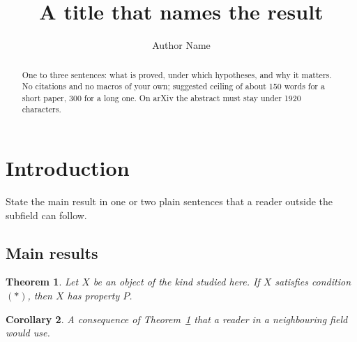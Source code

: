 \documentclass{amsart}
\theoremstyle{plain}
\newtheorem{theorem}{Theorem}[section]
\newtheorem{corollary}[theorem]{Corollary}
\theoremstyle{definition}
\theoremstyle{remark}
\begin{document}
\title[Short running title]{A title that names the result}
\author{Author Name}
\address{Department, Institution, City, Country}

\begin{abstract}
One to three sentences: what is proved, under which hypotheses, and why it matters.
No citations and no macros of your own; suggested ceiling of about 150 words for a short paper, 300 for a long one.
On arXiv the abstract must stay under 1920 characters.
\end{abstract}


\maketitle

\section{Introduction}\label{sec:intro}

State the main result in one or two plain sentences that a reader outside the
subfield can follow.

\subsection{Main results}\label{subsec:main}
\begin{theorem}\label{thm:main}
Let $X$ be an object of the kind studied here. If $X$ satisfies condition $(\ast)$,
then $X$ has property $P$.
\end{theorem}

\begin{corollary}\label{cor:main}
A consequence of Theorem~\ref{thm:main} that a reader in a neighbouring field would use.
\end{corollary}
\end{document}
